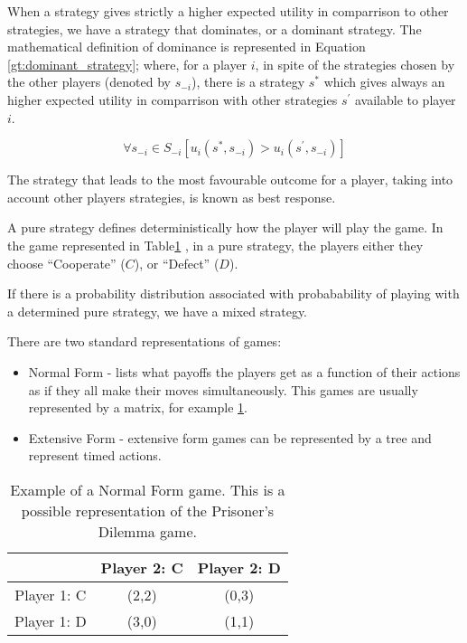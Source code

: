 When a strategy gives strictly a higher expected utility in comparrison to other strategies, we have a strategy that dominates, or a dominant strategy. The mathematical definition of dominance is represented in Equation \ref{gt:dominant_strategy}; where, for a player $i$, in spite of the strategies chosen by the other players (denoted by $s_{-i}$), there is a strategy $s^{*}$ which gives always an higher expected utility in comparrison with other strategies $s^{'}$ available to player $i$.

\begin{equation}
\forall s_{-i}\in S_{-i}[u_{i}(s^{*},s_{-i})>u_{i}(s^{'},s_{-i})]
\label{gt:dominant_strategy}
\end{equation}

The strategy that leads to the most favourable outcome for a player, taking into account other players strategies, is known as best response.

A pure strategy defines deterministically how the player will play the game. In the game represented in Table\ref{tab:2prisionersdillema_tab2} , in a pure strategy, the players either they choose ``Cooperate'' ($C$), or ``Defect'' ($D$). 

If there is a probability distribution associated with probabability of playing with a determined pure strategy, we have a mixed strategy. 

There are two standard representations of games:
\begin{itemize}
\item Normal Form - lists what payoffs the players get as a function of their actions as if they all make their moves simultaneously. This games are usually represented by a matrix, for example \ref{tab:2prisionersdillema_tab2}.



\item Extensive Form - extensive form games can be represented by a tree and represent timed actions.
\end{itemize}

\begin{center}
\begin{table}[h]
\begin{centering}
\begin{tabular}{ccc}
\hline 
 & Player 2: C & Player 2: D\tabularnewline
\hline 
Player 1: C & (2,2) & (0,3)\tabularnewline
Player 1: D & (3,0) & (1,1)\tabularnewline
\hline 
\end{tabular}
\par\end{centering}

\caption{Example of a Normal Form game. This is a possible representation of the Prisoner's Dilemma game.}
\label{tab:2prisionersdillema_tab2}
\end{table}
\par\end{center}

